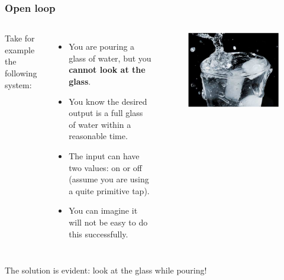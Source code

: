 \documentclass{beamer}
\begin{document}
\begin{frame}
\frametitle{Open loop}
\begin{columns}[c]

Take for example the following system:\\
\begin{itemize}
\item You are pouring a glass of water, but you \textbf{cannot look at the glass}.
\item You know the desired output is a full glass of water within a reasonable time.
\item The input can have two values: on or off (assume you are using a quite primitive tap).
\item You can imagine it will not be easy to do this successfully.
\end{itemize}

\begin{figure}
\includegraphics[width=1\linewidth]{glass}
\end{figure}

\end{columns}
\bigskip
The solution is evident: look at the glass while pouring!
\end{frame}

\end{document}
